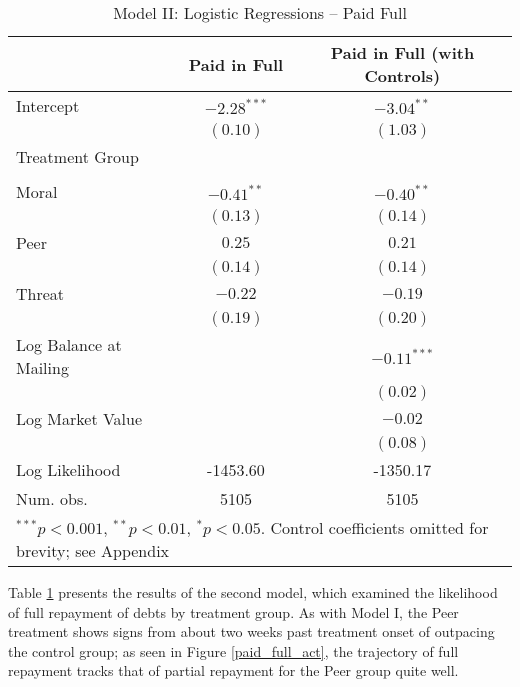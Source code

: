 \documentclass[12pt,titlepage]{article}
\begin{document}
\begin{table}[htbp]
\caption{Model II: Logistic Regressions -- Paid Full} \label{table:modelII}
\begin{center}
\begin{tabular}{l c c }
\hline
                       & Paid in Full & Paid in Full (with Controls) \\
\hline
Intercept              & $-2.28^{***}$ & $-3.04^{**}$  \\
                       & $(0.10)$      & $(1.03)$      \\
Treatment Group        &               &               \\
                       &               &               \\
\quad Moral            & $-0.41^{**}$  & $-0.40^{**}$  \\
                       & $(0.13)$      & $(0.14)$      \\
\quad Peer             & $0.25$        & $0.21$        \\
                       & $(0.14)$      & $(0.14)$      \\
\quad Threat           & $-0.22$       & $-0.19$       \\
                       & $(0.19)$      & $(0.20)$      \\
Log Balance at Mailing &               & $-0.11^{***}$ \\
                       &               & $(0.02)$      \\
Log Market Value       &               & $-0.02$       \\
                       &               & $(0.08)$      \\
\hline
Log Likelihood         & -1453.60      & -1350.17      \\
Num. obs.              & 5105          & 5105          \\
\hline
\multicolumn{3}{l}{\scriptsize{$^{***}p<0.001$, $^{**}p<0.01$, $^*p<0.05$. Control coefficients omitted for brevity; see Appendix}}
\end{tabular}
\end{center}
\end{table}

Table \ref{table:modelII} presents the results of the second model,
which examined the likelihood of full repayment of debts by treatment
group. As with Model I, the Peer treatment shows signs from about two
weeks past treatment onset of outpacing the control group; as seen in
Figure \ref{paid_full_act}, the trajectory of full repayment tracks
that of partial repayment for the Peer group quite well.
\end{document}
